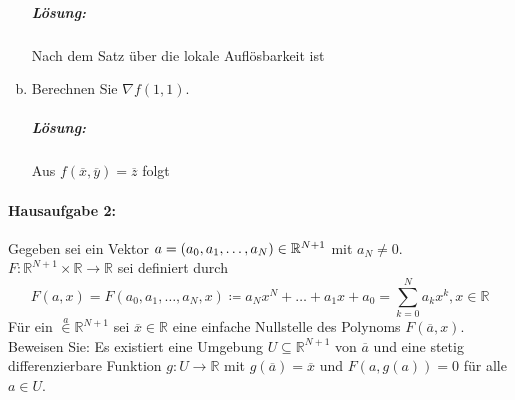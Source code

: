 \documentclass{scrreprt}
\begin{document}
\begin{enumerate}[a)]
  \subparagraph{Lösung:} Nach dem Satz über die lokale Auflösbarkeit ist

\newpage
\item Berechnen Sie $\nabla f(1, 1)$.

  \subparagraph{Lösung:} Aus $f(\overline{x}, \overline{y}) = \overline{z}$ folgt
\end{enumerate}

\paragraph{Hausaufgabe 2:} Gegeben sei ein Vektor
$a = \qty(a_0, a_1, \ldots, a_N) \in \mathbb{R}^{N + 1}$ mit $a_N \ne 0$.
$F \colon \mathbb{R}^{N + 1} \times \mathbb{R} \to \mathbb{R}$ sei definiert durch
\[
  F(a, x) = F(a_0, a_1, \ldots, a_N, x) \coloneqq
  a_Nx^N + \ldots + a_1x + a_0 = \sum_{k = 0}^N a_kx^k, x \in \mathbb{R}
\]
Für ein $\overset{a} \in \mathbb{R}^{N + 1}$ sei $\overline{x} \in \mathbb{R}$
eine einfache Nullstelle des Polynoms $F(\overline{a}, x)$.
Beweisen Sie: Es existiert eine Umgebung $U \subseteq \mathbb{R}^{N + 1}$ von
$\overline{a}$ und eine stetig differenzierbare Funktion
$g \colon U \to \mathbb{R}$ mit $g(\overline{a}) = \overline{x}$ und
$F(a, g(a)) = 0$ für alle $a \in U$.
\end{document}
